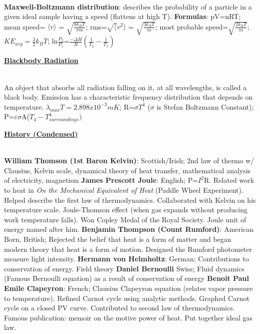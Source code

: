 \documentclass{article}
\begin{document}
\begin{multicols*}{3}{}
\\ \textbf{Maxwell-Boltzmann distribution}: describes the probability of a particle in a given ideal sample having a speed (flattens at high T). \textbf{Formulas}: pV=nRT; mean speed= $\langle v \rangle$ = $\sqrt{\frac{8k_{B}T}{\pi m}}$; rms=$\sqrt{\langle} v^{2} \rangle$ = $\sqrt{\frac{3k_{B}T}{m}}$; most probable speed=$\sqrt{\frac{2k_{B}T}{m}}$; $KE_{avg}=\frac{3}{2}k_{B}T$; ln$\frac{P_{2}}{P_{1}}$=$\frac{-\Delta H}{R}(\frac{1}{T_{2}}-\frac{1}{T_{1}})$
\\
\begin{small}
\textbf{\underline{Blackbody Radiation}}
\end{small}
\\
An object that absorbs all radiation falling on it, at all wavelengths, is called a black body. Emission has a characteristic frequency distribution that depends on temperature.  $\lambda_{max}T=2.898x10^{-3} mK$; R=$\sigma T^{4}$ ($\sigma$ is Stefan Boltzmann Constant); P=$\varepsilon \sigma$A($T_{4}-T_{surroundings}^{4})$
\begin{small}
\textbf{\underline{History (Condensed)}}
\end{small}
\\
\textbf{William Thomson (1st Baron Kelvin)}:
Scottish/Irish;
2nd law of thermo w/ Clausius, Kelvin scale, dynamical theory of heat transfer, mathematical analysis of electricity, magnetism
\textbf{James Prescott Joule}:
English;
P=$I^2$R. Related work to heat in \emph{On the Mechanical Equivalent of Heat} (Paddle Wheel Experiment). Helped describe the first law of thermodynamics. Collaborated with Kelvin on his temperature scale. Joule-Thomson effect (when gas expands without producing work temperature falls). Won Copley Medal of the Royal Society. Joule unit of energy named after him.
\textbf{Benjamin Thompson (Count Rumford)}:
American Born, British;
Rejected the belief that heat is a form of matter and began modern theory that heat is a form of motion. Designed the Rumford photometer measure light intensity.
\textbf{Hermann von Helmholtz}:
German;
Contributions to conservation of energy. Field theory
\textbf{Daniel Bernoulli}
Swiss;
Fluid dynamics (Famous Bernoulli equation) as a result of conservation of energy
\textbf{Benoit Paul Emile Clapeyron}:
French;
Clausius Clapeyron equation (relates vapor pressure to temperature). Refined Carnot cycle using analytic methods. Graphed Carnot cycle on a closed PV curve. Contributed to second law of thermodynamics. Famous publication: memoir on the motive power of heat. Put together ideal gas law.

\end{multicols*}
\end{document}
